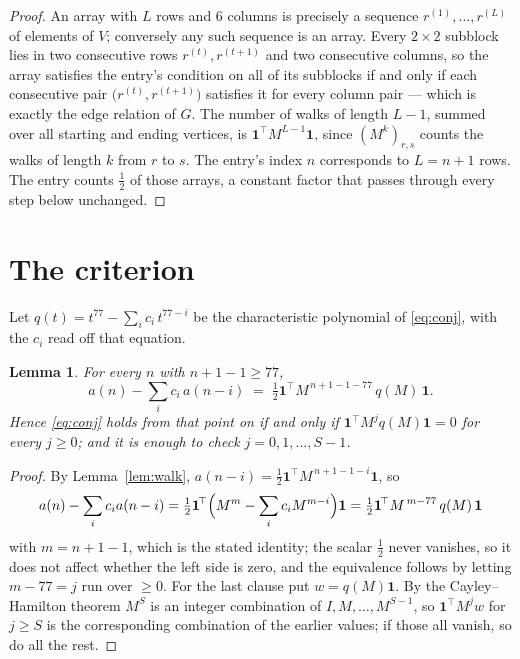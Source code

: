 \documentclass[11pt,a4paper]{article}
\theoremstyle{plain}
\newtheorem{lemma}[theorem]{Lemma}
\theoremstyle{definition}
\begin{document}
\begin{proof}
An array with $L$ rows and $6$ columns is precisely a sequence
$r^{(1)},\dots,r^{(L)}$ of elements of $V$; conversely any such sequence is an array.
Every $2\times2$ subblock lies in two consecutive rows $r^{(t)},r^{(t+1)}$ and two
consecutive columns, so the array satisfies the entry's condition on all of its subblocks
if and only if each consecutive pair $\bigl(r^{(t)},r^{(t+1)}\bigr)$ satisfies it for
every column pair --- which is exactly the edge relation of $G$. The number of walks of
length $L-1$, summed over all starting and ending vertices, is
$\mathbf{1}^{\!\top}M^{L-1}\mathbf{1}$, since $(M^{k})_{r,s}$ counts the walks of
length $k$ from $r$ to $s$. The entry's index $n$ corresponds to $L=n+1$ rows. The entry counts $\tfrac1{2}$ of those arrays, a constant factor that passes through every step below unchanged.
\end{proof}

\section{The criterion}

Let $q(t)=t^{77}-\sum_i c_i\,t^{77-i}$ be the characteristic polynomial of
\eqref{eq:conj}, with the $c_i$ read off that equation.

\begin{lemma}\label{lem:crit}
For every $n$ with $n+1-1\ge77$,
\[
a(n)-\sum_i c_i\,a(n-i)\;=\;\tfrac1{2}\mathbf{1}^{\!\top}M^{\,n+1-1-77}\,q(M)\,\mathbf{1} .
\]
Hence \eqref{eq:conj} holds from that point on if and only if
$\mathbf{1}^{\!\top}M^{j}q(M)\mathbf{1}=0$ for every $j\ge0$; and it is enough to check
$j=0,1,\dots,S-1$.
\end{lemma}

\begin{proof}
By Lemma~\ref{lem:walk}, $a(n-i)=\tfrac1{2}\mathbf{1}^{\!\top}M^{\,n+1-1-i}\mathbf{1}$, so
\[
a(n)-\sum_i c_i a(n-i)
=\tfrac1{2}\mathbf{1}^{\!\top}\Bigl(M^{m}-\sum_i c_i M^{m-i}\Bigr)\mathbf{1}
=\tfrac1{2}\mathbf{1}^{\!\top}M^{\,m-77}\,q(M)\,\mathbf{1}
\]
with $m=n+1-1$, which is the stated identity; the scalar $\tfrac1{2}$ never vanishes, so it does not affect whether the left side is zero, and the equivalence follows by letting
$m-77=j$ run over $\ge0$. For the last clause put $w=q(M)\mathbf{1}$. By the
Cayley--Hamilton theorem $M^{S}$ is an integer combination of $I,M,\dots,M^{S-1}$, so
$\mathbf{1}^{\!\top}M^{j}w$ for $j\ge S$ is the corresponding combination of the earlier
values; if those all vanish, so do all the rest.
\end{proof}
\end{document}
